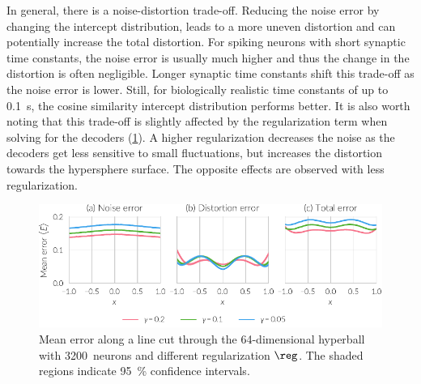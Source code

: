 In general, there is a noise-distortion trade-off.
Reducing the noise error by changing the intercept distribution, leads to a more uneven distortion and can potentially increase the total distortion.
For spiking neurons with short synaptic time constants, the noise error is usually much higher and thus the change in the distortion is often negligible.
Longer synaptic time constants shift this trade-off as the noise error is lower.
Still, for biologically realistic time constants of up to \SI{0.1}{\second}, the cosine similarity intercept distribution performs better.
It is also worth noting that this trade-off is slightly affected by the regularization term when solving for the decoders (\cref{fig:error-cs-intercepts-reg}).
A higher regularization decreases the noise as the decoders get less sensitive to small fluctuations, but increases the distortion towards the hypersphere surface.
The opposite effects are observed with less regularization.
\begin{figure}
    \centering
    \includegraphics{figures/error-cs-intercepts-reg}
    \caption[Mean error along line cut with different regularization]{Mean error along a line cut through the 64-dimensional hyperball with \num{3200}~neurons and different regularization $\reg$. The shaded regions indicate \SI{95}{\percent} confidence intervals.}\label{fig:error-cs-intercepts-reg}
\end{figure}

